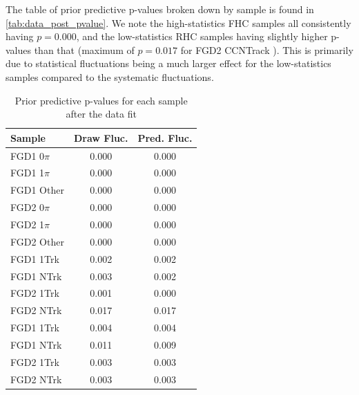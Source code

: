 The table of prior predictive p-values broken down by sample is found in \autoref{tab:data_post_pvalue}. We note the high-statistics FHC samples all consistently having $p=0.000$, and the low-statistics RHC samples having slightly higher p-values than that (maximum of $p=0.017$ for FGD2 CCNTrack \numubar). This is primarily due to statistical fluctuations being a much larger effect for the low-statistics samples compared to the systematic fluctuations.
\begin{table}[h]
	\centering
	\begin{tabular}{l | c c }
		\hline \hline
		Sample & Draw Fluc. & Pred. Fluc. \\
		\hline
		FGD1 0$\pi$ & 0.000 & 0.000 \\
		FGD1 1$\pi$ & 0.000 & 0.000 \\
		FGD1 Other  & 0.000 & 0.000 \\
		FGD2 0$\pi$ & 0.000 & 0.000 \\
		FGD2 1$\pi$ & 0.000 & 0.000 \\
		FGD2 Other  & 0.000 & 0.000 \\
		\hline
		FGD1 1Trk & 0.002 & 0.002 \\
		FGD1 NTrk & 0.003 & 0.002 \\
		FGD2 1Trk & 0.001 & 0.000 \\
		FGD2 NTrk & 0.017 & 0.017 \\
		\hline
		FGD1 \numu 1Trk & 0.004 & 0.004 \\
		FGD1 \numu NTrk & 0.011 & 0.009 \\
		FGD2 \numu 1Trk & 0.003 & 0.003 \\
		FGD2 \numu NTrk & 0.003 & 0.003 \\
		\hline
		\hline
	\end{tabular}
	\caption{Prior predictive p-values for each sample after the data fit}
	\label{tab:data_post_pvalue}
\end{table}

